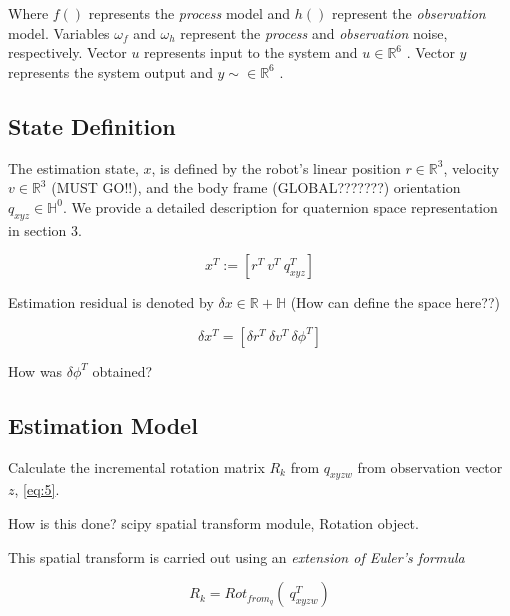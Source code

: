 \documentclass[letterpaper, 10 pt, conference]{ieeeconf}  %
\newcommand{\transpose}[1]{\ensuremath{#1^{\scriptscriptstyle T}}}
\begin{document}
Where $f()$ represents the \textit{process} model and $h()$ represent the
\textit{observation} model.
Variables $\omega_{f}$ and $\omega_{h}$ represent the \textit{process} and \textit{observation} noise, respectively.
Vector $u$ represents input to the system and $u \in \mathbb{R}^{6}$ .
Vector $y$ represents the system output and $y \sim \in \mathbb{R}^6$ .


\subsection{State Definition}

The estimation state, $x$, is defined by the robot's linear position $r \in \mathbb{R}^3$, velocity
$v \in \mathbb{R}^3$ (MUST GO!!), and the body frame (GLOBAL???????) orientation $q_{xyz} \in \mathbb{H}^0$. We provide a detailed description for quaternion space representation in section 3.

\begin{equation}
\label{eq:8}
\transpose{x} :=  \left[\transpose{r}~\transpose{v}~\transpose{q_{xyz}} \right]
\end{equation}


Estimation residual is denoted by $\delta x \in \mathbb{R + H}$  (How can define the space here??)


\begin{equation}
\label{eq:10}
\delta \transpose{x} = \left[\transpose{\delta r} ~\transpose{\delta v} ~\transpose{\delta \phi} \right]
\end{equation}

How was $ \transpose{\delta \phi} $ obtained?


\subsection{Estimation Model}

Calculate the incremental rotation matrix $R_k$ from $q_{xyzw}$ from observation
vector $z$, \ref{eq:5}.

How is this done? scipy spatial transform module, Rotation object.

This spatial transform is carried out using an \textit{extension of Euler's formula}

\begin{equation}
\label{eq:11}
R_{k} = Rot_{from_q} \left( ~\transpose{q_{xyzw} } \right)
\end{equation}
\end{document}
